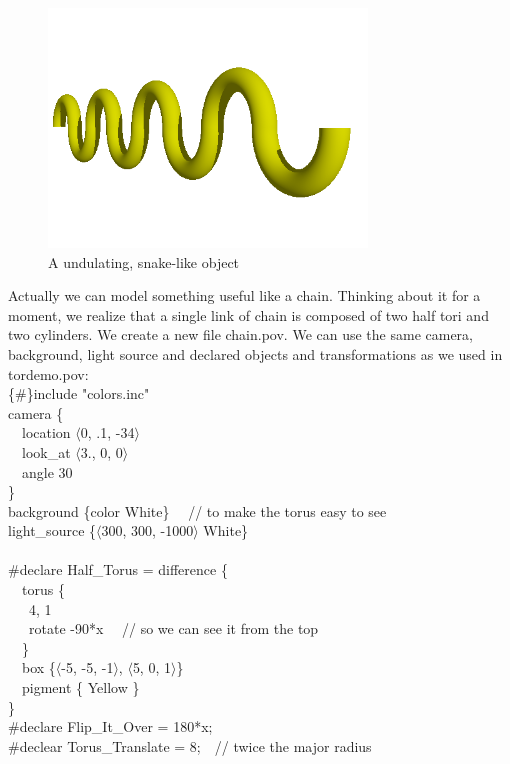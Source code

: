 \documentclass[fleqn,10pt]{wlscirep}
\begin{document}
\begin{figure}[htbp]
\centering
\includegraphics[width=20pc,clip]{FIG9}
\caption{A undulating, snake-like object}
\label{fig:FIG9}
\end{figure}
\noindent Actually we can model something useful like a chain. Thinking about it for a moment, we realize that a single link of chain is composed of two half tori and two cylinders. We create a new file chain.pov. We can use the same camera, background, light source and declared objects and transformations as we used in tordemo.pov:\\
{\color{blue}
\{\#\}include "colors.inc"   \\
camera \{   \\
\ \ location $\langle$0, .1, -34$\rangle$   \\
\ \ look\_at $\langle$3., 0, 0$\rangle$   \\
\ \ angle 30    \\
\}   \\
background \{color White\} \ \ // to make the torus easy to see   \\
light\_source \{$\langle$300, 300, -1000$\rangle$ White\}   \\
}\\
{\color{blue}
\#declare Half\_Torus = difference \{  \\
\ \ torus \{ \\
\ \ \ 4, 1  \\
\ \ \ rotate -90*x \ \ // so we can see it from the top  \\
\ \ \}  \\
\ \ box \{$\langle$-5, -5, -1$\rangle$, $\langle$5, 0, 1$\rangle$\}  \\
\ \ pigment \{ Yellow \}  \\
\}  \\
\#declare Flip\_It\_Over = 180*x;  \\
\#declear Torus\_Translate = 8;\ \ // twice the major radius
}\\
\end{document}
